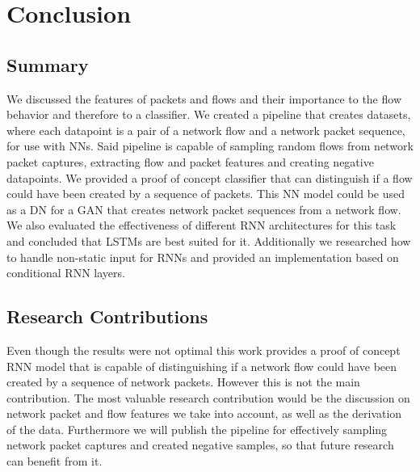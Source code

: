 \documentclass[
	ngerman,
	ruledheaders=section,%
	class=report,%
	thesis={type=bachelor},%
	accentcolor=9c,%
	custommargins=true,%
	marginpar=false,%
	parskip=half-,%
	fontsize=11pt,%
]{tudapub}
\begin{document}

\chapter{Conclusion}
\label{sec:conclusion}


\section{Summary}
\label{sec:summary}

We discussed the features of packets and flows and their importance to the flow behavior and therefore to a classifier.
We created a pipeline that creates datasets, where each datapoint is a pair of a network flow and a network packet sequence, for use with NNs.
Said pipeline is capable of sampling random flows from network packet captures, extracting flow and packet features and creating negative datapoints.
We provided a proof of concept classifier that can distinguish if a flow could have been created by a sequence of packets.
This NN model could be used as a DN for a GAN that creates network packet sequences from a network flow.
We also evaluated the effectiveness of different RNN architectures for this task
and concluded that LSTMs are best suited for it.
Additionally we researched how to handle non-static input for RNNs and provided an implementation based on conditional RNN layers.

\section{Research Contributions}
\label{sec:Contributions}

Even though the results were not optimal this work provides a proof of concept RNN model that is capable of distinguishing if a network flow could have been created by a sequence of network packets.
However this is not the main contribution.
The most valuable research contribution would be the discussion on network packet and flow features we take into account, as well as the derivation of the data.
Furthermore we will publish the pipeline for effectively sampling network packet captures and created negative samples, so that future research can benefit from it.
\end{document}
